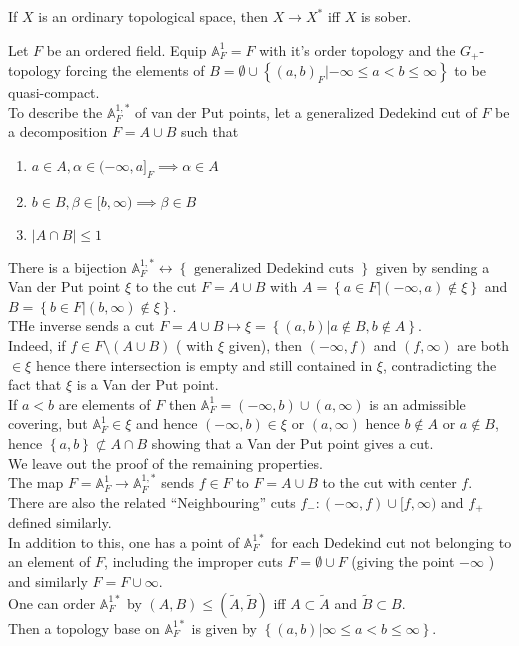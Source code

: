\documentclass[../main.tex]{subfiles}
\begin{document}
\begin{crly}
If $X$ is an ordinary topological space, then $X \to X^{\ast}$ iff $X$ is sober.
\end{crly}
\begin{exemple}
Let $F$ be an ordered field. Equip $\mathbb{A}^{1}_F=F$ with it's order topology and the $G_+$-topology forcing the elements of $B= \emptyset\cup \left\{ ( a,b)_F | - \infty \leq a < b \leq \infty \right\} $ to be quasi-compact.\\
To describe the $\mathbb{A}^{1,\ast}_F $ of van der Put points, let a generalized Dedekind cut of $F$ be a decomposition $F= A \cup B$ such that
\begin{enumerate}
	\item $a\in A, \alpha \in ( - \infty , a]_F \implies \alpha\in A $ 
	\item $b\in B, \beta \in [ b, \infty ) \implies \beta \in B $ 
	\item $|A\cap B| \leq 1$ 
\end{enumerate}
There is a bijection $\mathbb{A}^{1, \ast}_F \leftrightarrow \left\{ \text{ generalized Dedekind cuts }  \right\} $ given by sending a Van der Put point $\xi$ to the cut $F= A \cup B$ with $A= \left\{ a\in F| ( - \infty , a) \notin \xi \right\} $ and $B = \left\{ b \in F |( b, \infty ) \notin \xi \right\} $.\\
THe inverse sends a cut $F= A \cup B \mapsto \xi = \left\{ ( a,b) |a \notin B, b \notin A\right\} $.\\
Indeed, if $f\in F\setminus ( A\cup B) $ ( with $\xi$ given), then $( - \infty ,f) $ and $( f, \infty) $ are both $\in \xi$ hence there intersection is empty and still contained in $\xi$, contradicting the fact that $\xi$ is a Van der Put point.\\
If $a< b$ are elements of $F$ then $\mathbb{A}_F^{1}= ( - \infty ,b) \cup ( a, \infty ) $ is an admissible covering, but $\mathbb{A}^{1}_F\in \xi$ and hence $( - \infty ,b) \in \xi$ or $ ( a, \infty ) $ hence $b \notin A$ or $a\notin B$, hence $ \left\{ a,b \right\} \not \subset A\cap B$ showing that a Van der Put point gives a cut.\\
We leave out the proof of the remaining properties.\\
The map $F= \mathbb{A}_F^{1}\to \mathbb{A}_F^{1, \ast}$ sends $f\in F$ to $F= A \cup B$ to the cut with center $f$.\\
There are also the related ``Neighbouring'' cuts $f_-: ( - \infty , f) \cup [ f, \infty ) $ and $f_+$ defined similarly.\\
In addition to this, one has a point of $\mathbb{A}^{1\ast}_F$ for each Dedekind cut not belonging to an element of $F$, including the improper cuts $F= \emptyset \cup F$ (giving the point $- \infty $ ) and similarly $F= F\cup \infty$.\\
One can order $\mathbb{A}_F^{1\ast}$ by $( A,B) \leq ( \tilde A, \tilde B) $ iff $A \subset \tilde A$ and $\tilde B \subset B$.\\
Then a topology base on $\mathbb{A}_F^{1\ast}$ is given by $ \left\{ ( a,b) | \infty \leq a <b \leq \infty  \right\} $.
\end{exemple}
\end{document}
